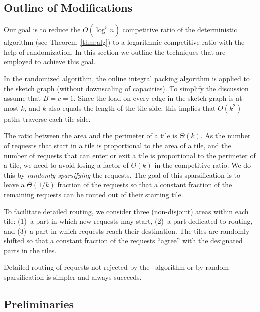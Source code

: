 \documentclass[11pt]{article}
\newcommand{\route}{\text{\sc{ipp}}}
\newcommand{\IPP}{\route}
\newenvironment{proof sketch}[1]{\noindent {\emph{Proof sketch of #1:}}}{\hfill \qed}
\begin{document}
\subsection{Outline of Modifications}\label{sec:comparison}
Our goal is to reduce the  $O(\log^5 n)$ competitive ratio of the deterministic algorithm (see
Theorem~\ref{thm:alg}) to a logarithmic competitive ratio with
the help of randomization.  In this section we outline the techniques that are
employed to achieve this goal.

In the randomized algorithm, the online integral packing algorithm is
applied to the sketch graph (without downscaling of capacities). To
simplify the discussion assume that $B=c=1$.  Since the load on every
edge in the sketch graph is at most $k$, and $k$ also equals the length of
the tile side, this implies that $O(k^2)$ paths traverse each tile side.

The ratio between the area and the perimeter of a tile is $\Theta(k)$.
As the number of requests that start in a tile is proportional to the
area of a tile, and the number of requests that can enter or exit a tile
is proportional to the perimeter of a tile, we need to avoid losing a
factor of $\Theta(k)$ in the competitive ratio. We do this by
\emph{randomly sparsifying} the requests. The goal of this
sparsification is to leave a $\Theta(1/k)$ fraction of the requests so
that a constant fraction of the remaining requests can be routed out
of their starting tile.

To facilitate detailed routing, we consider three (non-disjoint) areas within each
tile: (1)~a part in which new requests may start, (2)~a part dedicated to routing,
and (3)~a part in which requests reach their destination.  The tiles are randomly
shifted so that a constant fraction of the requests ``agree'' with the designated
parts in the tiles.

Detailed routing of requests not rejected by the \IPP\
algorithm or by random sparsification is simpler and always
succeeds.

\subsection{Preliminaries}\label{sect:prelimline}


\begin{comment}
\begin{figure}\centering
\texttt{[image: sketchuntilt.eps]}
\caption{
Tiling of the untilted space-time graph $G^{st}$ by rectangles. Only the shaded tiles are nodes of the sketch graph. Note that if the SW-quadrant of a tile does not contain nodes from $G^{st}$, then this tile is removed.
The sketch graph over the tiles is depicted by the black circles and the incident directed edges.}
\label{fig:sketch}
\end{figure}
\end{comment}
\end{document}
